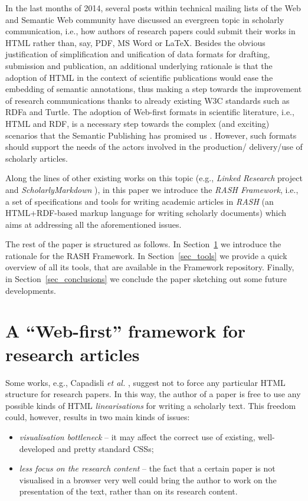 \documentclass[runningheads,a4paper]{llncs}
\begin{document}
In the last months of 2014, several posts within technical mailing lists of the Web and Semantic Web community have discussed an evergreen topic in scholarly communication, i.e., how authors of research papers could submit their works in HTML rather than, say, PDF, MS Word or LaTeX. Besides the obvious justification of simplification and unification of data formats for drafting, submission and publication, an additional underlying rationale is that the adoption of HTML in the context of scientific publications would ease the embedding of semantic annotations, thus making a step towards the improvement of research communications thanks to already existing W3C standards such as RDFa and Turtle. The adoption of Web-first formats in scientific literature, i.e., HTML and RDF, is a necessary step towards the complex (and exciting) scenarios that the Semantic Publishing has promised us  \cite{force11} \cite{shotton-sempub}. However, such formats should support the needs of the actors involved in the production/ delivery/use of scholarly articles.

Along the lines of other existing works on this topic (e.g., {\em Linked Research} project  \cite{linked-research} and {\em ScholarlyMarkdown} \cite{scholmd}), in this paper we introduce the {\em RASH Framework}, i.e., a set of specifications and tools for writing academic articles in {\em RASH} (an HTML+RDF-based markup language for writing scholarly documents) which aims at addressing all the aforementioned issues.

The rest of the paper is structured as follows. In Section~\ref{sec_rationale} we introduce the rationale for the RASH Framework. In Section~\ref{sec_tools} we provide a quick overview of all its tools, that are available in the Framework repository. Finally, in Section~\ref{sec_conclusions} we conclude the paper sketching out some future developments.

\section{A ``Web-first'' framework for research articles}\label{sec_rationale}

Some works, e.g., Capadisli {\em et al.} \cite{linked-research}, suggest not to force any particular HTML structure for research papers. In this way, the author of a paper is free to use any possible kinds of HTML {\em linearisations} for writing a scholarly text. This freedom could, however, results in two main kinds of issues:
\begin{itemize}
\item {\em visualisation bottleneck} -- it may affect the correct use of existing, well-developed and pretty standard CSSs;
\item {\em less focus on the research content} -- the fact that a certain paper is not visualised in a browser very well could bring the author to work on the presentation of the text, rather than on its research content.
\end{itemize}
\end{document}
